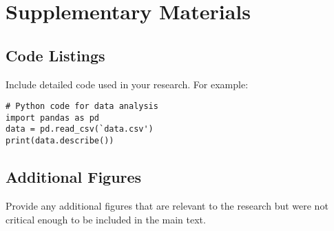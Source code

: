 \chapter{Supplementary Materials}
\label{appendix:B}

\section{Code Listings}
Include detailed code used in your research. For example:
\begin{verbatim}
# Python code for data analysis
import pandas as pd
data = pd.read_csv(`data.csv')
print(data.describe())
\end{verbatim}

\section{Additional Figures}
Provide any additional figures that are relevant to the research but were not critical enough to be included in the main text.
